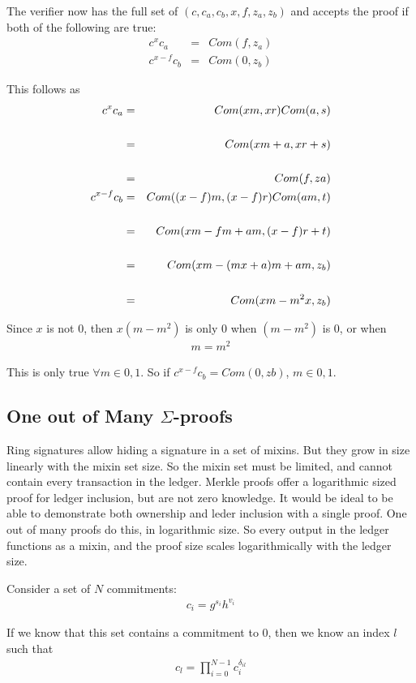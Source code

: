 \documentclass{article}
\begin{document}
The verifier now has the full set of $(c, c_a, c_b, x, f, z_a, z_b)$ and accepts the proof if both of the following are true:
\begin{eqnarray}
  c^x c_a &=& Com(f, z_a)\\
  c^{x-f} c_b &=& Com(0, z_b)
\end{eqnarray}

This follows as 
\begin{eqnarray}
  c^x c_a &=& Com(xm,xr) Com(a,s)\\
  \cr &=& Com(xm+a, xr+s)\\
  \cr &=& Com(f, za)\\
  c^{x-f} c_b &=& Com((x-f)m, (x-f)r) Com(am, t)\\
  \cr &=& Com(xm - fm + am, (x-f)r + t)\\
  \cr &=& Com(xm - (mx + a)m + am, z_b)\\
  \cr &=& Com(xm - m^2 x, z_b)
\end{eqnarray}

Since $x$ is not $0$, then $x (m-m^2)$ is only $0$ when $(m-m^2)$ is $0$, or when
\begin{eqnarray}
  m = m^2
\end{eqnarray}

This is only true $\forall m \in {0,1}$.  So if $c^{x-f} c_b = Com(0,zb)$, $m \in {0,1}$.


\subsection{One out of Many $\Sigma$-proofs}

Ring signatures allow hiding a signature in a set of mixins.  But they grow in size linearly with the mixin set size.  So the mixin set must be limited, and cannot contain every transaction in the ledger.  Merkle proofs offer a logarithmic sized proof for ledger inclusion, but are not zero knowledge.  It would be ideal to be able to demonstrate both ownership and leder inclusion with a single proof.  One out of many proofs do this, in logarithmic size.  So every output in the ledger functions as a mixin, and the proof size scales logarithmically with the ledger size.

Consider a set of $N$ commitments:
\begin{eqnarray}
  c_i = g^{s_i} h^{v_i}
\end{eqnarray}

If we know that this set contains a commitment to $0$, then we know an index $l$ such that
\begin{eqnarray}
  c_l = \prod_{i=0}^{N-1} c_i^{\delta_{il}}
\end{eqnarray}
\end{document}
